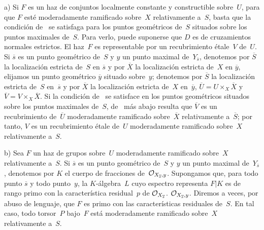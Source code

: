 \setcounter{proposition}{2}%
\begin{remarques}
\label{XIII.2.3}

a) Si $F$ es un haz de conjuntos localmente constante y constructible
sobre~$U$, para que $F$ esté moderadamente ramificado sobre~$X$ relativamente
a~$S$, basta que la condición de~ se satisfaga para los puntos
geométricos de~$S$ situados sobre los puntos maximales de~$S$. Para verlo,
puede suponerse que $D$ es de cruzamientos normales estrictos. El haz~$F$ es
representable por un recubrimiento étale~$V$ de~$U$. Si $\overline{s}$ es un
punto geométrico de~$S$ y $y$ un punto maximal de~$Y_{\overline{s}}$,
{denotemos por $\overline{S}$ la localización estricta de~$S$ en
$\overline{s}$ y por $\overline{X}$ la localización estricta de~$X$ en
$\overline{y}$,}
{elijamos un punto geométrico $\overline y$ situado sobre~$y$; denotemos por
$\overline{S}$ la localización estricta de~$S$ en~$\overline{s}$ y por
$\overline{X}$ la localización estricta de~$X$ en~$\overline{y}$,}
$\overline{U}=U\times_X\overline{X}$ y
$\overline{V}=V\times_X\overline{X}$. Si la condición
de~ se satisface en los puntos geométricos situados sobre los
puntos maximales de~$S$, de~ más abajo resulta que
$\overline{V}$ es un recubrimiento de~$\overline{U}$ moderadamente ramificado
sobre~$\overline{X}$ relativamente a~$\overline{S}$; por tanto, $V$ es un
recubrimiento étale de~$U$ moderadamente ramificado sobre~$X$ relativamente
a~$S$.

b)
Sea $F$ un haz de grupos sobre~$U$ moderadamente ramificado sobre~$X$
relativamente a~$S$. Si $\overline{s}$ es un punto geométrico de~$S$ y $y$
un punto maximal de~$Y_{\overline{s}}$, denotemos por $K$ el cuerpo de
fracciones de~$\cal{O}_{X_{\overline{s}},y}$. Supongamos que, para todo punto
$\overline{s}$ y todo punto~$y$, la $K$-álgebra~$L$ cuyo espectro representa
$F|K$ es de rango primo con la característica residual~$p$ de
{$\cal{O}_{X_{\overline{s}}}$.}
{$\cal{O}_{X_{\overline{s}},y}$.}
Diremos a veces, por abuso de lenguaje, que $F$ es primo con las
características residuales de~$S$.
%
En tal caso, todo torsor~$P$ bajo~$F$ está moderadamente ramificado sobre~$X$
relativamente a~$S$.


\end{remarques}
